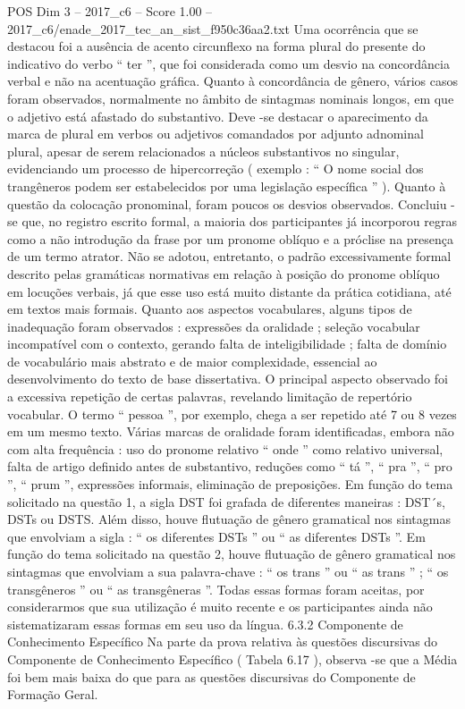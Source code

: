 \begin{textsample}{POS Dim 3 – 2017\_c6 – Score 1.00 – 2017\_c6/enade\_2017\_tec\_an\_sist\_f950c36aa2.txt}
Uma ocorrência que se destacou foi a ausência de acento circunflexo na forma plural do presente do indicativo do verbo “ ter ”, que foi considerada como um desvio na concordância verbal e não na acentuação gráfica.
Quanto à concordância de gênero, vários casos foram observados, normalmente no âmbito de sintagmas nominais longos, em que o adjetivo está afastado do substantivo.
Deve -se destacar o aparecimento da marca de plural em verbos ou adjetivos comandados por adjunto adnominal plural, apesar de serem relacionados a núcleos substantivos no singular, evidenciando um processo de hipercorreção ( exemplo : “ O nome social dos trangêneros podem ser estabelecidos por uma legislação específica ” ).
Quanto à questão da colocação pronominal, foram poucos os desvios observados.
Concluiu -se que, no registro escrito formal, a maioria dos participantes já incorporou regras como a não introdução da frase por um pronome oblíquo e a próclise na presença de um termo atrator.
Não se adotou, entretanto, o padrão excessivamente formal descrito pelas gramáticas normativas em relação à posição do pronome oblíquo em locuções verbais, já que esse uso está muito distante da prática cotidiana, até em textos mais formais.
Quanto aos aspectos vocabulares, alguns tipos de inadequação foram observados : expressões da oralidade ; seleção vocabular incompatível com o contexto, gerando falta de inteligibilidade ; falta de domínio de vocabulário mais abstrato e de maior complexidade, essencial ao desenvolvimento do texto de base dissertativa.
O principal aspecto observado foi a excessiva repetição de certas palavras, revelando limitação de repertório vocabular.
O termo “ pessoa ”, por exemplo, chega a ser repetido até 7 ou 8 vezes em um mesmo texto.
Várias marcas de oralidade foram identificadas, embora não com alta frequência : uso do pronome relativo “ onde ” como relativo universal, falta de artigo definido antes de substantivo, reduções como “ tá ”, “ pra ”, “ pro ”, “ prum ”, expressões informais, eliminação de preposições.
Em função do tema solicitado na questão 1, a sigla DST foi grafada de diferentes maneiras : DST´s, DSTs ou DSTS.
Além disso, houve flutuação de gênero gramatical nos sintagmas que envolviam a sigla : “ os diferentes DSTs ” ou “ as diferentes DSTs ”.
Em função do tema solicitado na questão 2, houve flutuação de gênero gramatical nos sintagmas que envolviam a sua palavra-chave : “ os trans ” ou “ as trans ” ; “ os transgêneros ” ou “ as transgêneras ”.
Todas essas formas foram aceitas, por considerarmos que sua utilização é muito recente e os participantes ainda não sistematizaram essas formas em seu uso da língua. 6.3.2 Componente de Conhecimento Específico Na parte da prova relativa às questões discursivas do Componente de Conhecimento Específico ( Tabela 6.17 ), observa -se que a Média foi bem mais baixa do que para as questões discursivas do Componente de Formação Geral.

\end{textsample}
